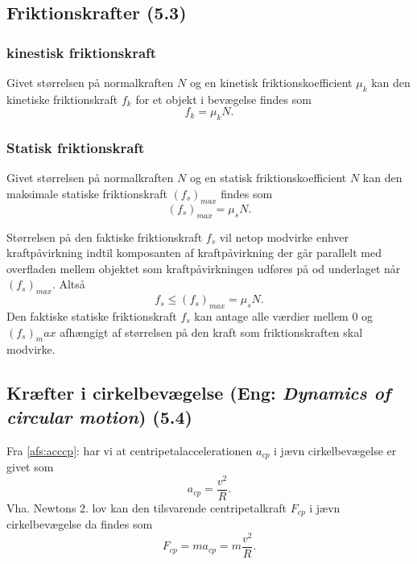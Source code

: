 \subsection{Friktionskrafter (5.3)}

\subsubsection{kinestisk friktionskraft} \label{afs:kinfrik}
Givet størrelsen på normalkraften $N$ og en kinetisk friktionskoefficient $\mu_k$ kan den kinetiske friktionskraft $f_k$ for et objekt i bevægelse findes som
\[ 
f_k = \mu_k N
.\]

\subsubsection{Statisk friktionskraft} \label{afs:statfrik}
Givet størrelsen på normalkraften $N$ og en statisk friktionskoefficient $N$ kan den maksimale statiske friktionskraft $(f_s)_{max}$ findes som
\[ 
(f_s)_{max} = \mu_s N
.\]

Størrelsen på den faktiske friktionskraft $f_s$ vil netop modvirke enhver kraftpåvirkning indtil komposanten af kraftpåvirkning der går parallelt med overfladen mellem objektet som kraftpåvirkningen udføres på od underlaget når $(f_s)_{max}$. Altså
\[ 
f_s \leq (f_s)_{max} = \mu_s N
.\]
Den faktiske statiske friktionskraft $f_s$ kan antage alle værdier mellem 0 og $(f_s)_max$ afhængigt af størrelsen på den kraft som friktionskraften skal modvirke.


\subsection{Kræfter i cirkelbevægelse (Eng: \textit{Dynamics of circular motion}) (5.4)} \label{afs:cp}
Fra \ref{afs:acccp}:  har vi at centripetalaccelerationen $a_{cp}$ i jævn cirkelbevægelse er givet som
\[ 
a_{cp} = \frac{v^2}{R}
.\]
Vha. Newtons 2. lov kan den tilsvarende centripetalkraft $F_{cp}$ i jævn cirkelbevægelse da findes som
\[ 
F_{cp} = ma_{cp} = m \frac{v^2}{R}
.\]
